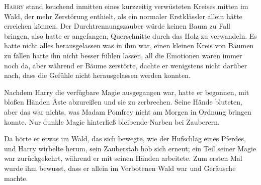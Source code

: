 
\lettrine{H}{arry} stand keuchend inmitten eines kurzzeitig verwüsteten Kreises mitten im Wald, der mehr Zerstörung enthielt, als ein normaler Erstklässler allein hätte erreichen können. Der Durchtrennungszauber würde keinen Baum zu Fall bringen, also hatte er angefangen, Querschnitte durch das Holz zu verwandeln. Es hatte nicht alles herausgelassen was in ihm war, einen kleinen Kreis von Bäumen zu fällen hatte ihn nicht besser fühlen lassen, all die Emotionen waren immer noch da, aber während er Bäume zerstörte, dachte er wenigstens nicht darüber nach, dass die Gefühle nicht herausgelassen werden konnten.

Nachdem Harry die verfügbare Magie ausgegangen war, hatte er begonnen, mit bloßen Händen Äste abzureißen und sie zu zerbrechen. Seine Hände bluteten, aber das war nichts, was Madam Pomfrey nicht am Morgen in Ordnung bringen konnte. Nur dunkle Magie hinterließ bleibende Narben bei Zauberern.

Da hörte er etwas im Wald, das sich bewegte, wie der Hufschlag eines Pferdes, und Harry wirbelte herum, sein Zauberstab hob sich erneut; ein Teil seiner Magie war zurückgekehrt, während er mit seinen Händen arbeitete. Zum ersten Mal wurde ihm bewusst, dass er allein im Verbotenen Wald war und Geräusche machte.


